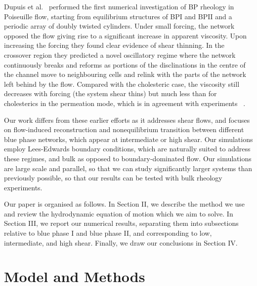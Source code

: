 \documentclass[aps,pre,reprint,superscriptaddress, twocolumn]{revtex4}
\begin{document}
Dupuis et al.~\cite{Dupuis:2005} performed the first numerical investigation of BP rheology 
in Poiseuille flow, starting from equilibrium structures of BPI and BPII and a periodic 
array of doubly twisted cylinders.
Under small forcing, the network opposed the flow giving rise to a significant 
increase in apparent viscosity.
Upon increasing the forcing they found clear evidence of shear thinning.
In the crossover region they predicted a novel oscillatory regime where the network 
continuously breaks and reforms as portions of the disclinations in the centre of the channel 
move to neighbouring cells and relink with the parts of the network left behind by the flow. 
Compared with the cholesteric case, the viscosity still decreases with forcing 
(the system shear thins) but much less than
for cholesterics in the permeation mode, which is in agreement with experiments
~\cite{Zapotocky:1999, Ramos:2002}.

Our work differs from these earlier efforts as it addresses shear flows, 
and focuses on flow-induced reconstruction and nonequilibrium transition
between different blue phase networks, which appear at intermediate or
high shear. Our simulations employ Lees-Edwards boundary conditions, which
are naturally suited to address these regimes, and bulk as opposed
to boundary-dominated flow. 
Our simulations are large scale and parallel, so that we can study
significantly larger systems than previously possible, so that our
results can be tested with bulk rheology experiments. 

Our paper is organised as follows. 
In Section II, we describe the method we use and review
the hydrodynamic equation of motion which we aim to solve. In Section III, 
we report our numerical results, separating them into subsections relative to
blue phase I and blue phase II, and corresponding to low, intermediate, and
high shear. Finally, we draw our conclusions in Section IV.

\section{Model and Methods}
\end{document}
